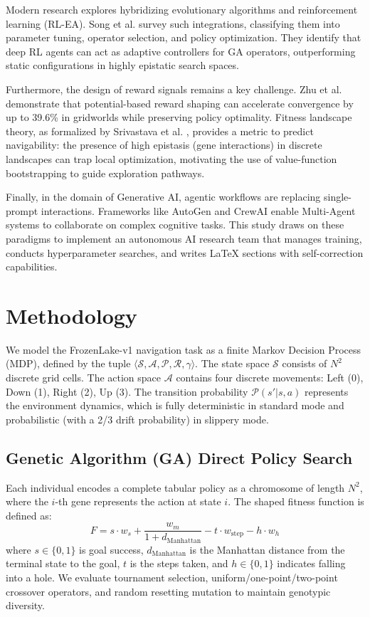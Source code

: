 \documentclass[conference]{IEEEtran}
\begin{document}
Modern research explores hybridizing evolutionary algorithms and reinforcement learning (RL-EA). Song et al. \cite{b4} survey such integrations, classifying them into parameter tuning, operator selection, and policy optimization. They identify that deep RL agents can act as adaptive controllers for GA operators, outperforming static configurations in highly epistatic search spaces.

Furthermore, the design of reward signals remains a key challenge. Zhu et al. \cite{b5} demonstrate that potential-based reward shaping can accelerate convergence by up to 39.6\% in gridworlds while preserving policy optimality. Fitness landscape theory, as formalized by Srivastava et al. \cite{b6}, provides a metric to predict navigability: the presence of high epistasis (gene interactions) in discrete landscapes can trap local optimization, motivating the use of value-function bootstrapping to guide exploration pathways.

Finally, in the domain of Generative AI, agentic workflows are replacing single-prompt interactions. Frameworks like AutoGen and CrewAI enable Multi-Agent systems to collaborate on complex cognitive tasks. This study draws on these paradigms to implement an autonomous AI research team that manages training, conducts hyperparameter searches, and writes LaTeX sections with self-correction capabilities.

\section{Methodology}

We model the FrozenLake-v1 navigation task as a finite Markov Decision Process (MDP), defined by the tuple $\langle \mathcal{S}, \mathcal{A}, \mathcal{P}, \mathcal{R}, \gamma \rangle$. The state space $\mathcal{S}$ consists of $N^2$ discrete grid cells. The action space $\mathcal{A}$ contains four discrete movements: Left (0), Down (1), Right (2), Up (3). The transition probability $\mathcal{P}(s' | s, a)$ represents the environment dynamics, which is fully deterministic in standard mode and probabilistic (with a 2/3 drift probability) in slippery mode.

\subsection{Genetic Algorithm (GA) Direct Policy Search}
Each individual encodes a complete tabular policy as a chromosome of length $N^2$, where the $i$-th gene represents the action at state $i$. The shaped fitness function is defined as:
\begin{equation}
F = s \cdot w_s + \frac{w_m}{1 + d_{\text{Manhattan}}} - t \cdot w_{\text{step}} - h \cdot w_h
\end{equation}
where $s \in \{0,1\}$ is goal success, $d_{\text{Manhattan}}$ is the Manhattan distance from the terminal state to the goal, $t$ is the steps taken, and $h \in \{0,1\}$ indicates falling into a hole. We evaluate tournament selection, uniform/one-point/two-point crossover operators, and random resetting mutation to maintain genotypic diversity.
\end{document}
